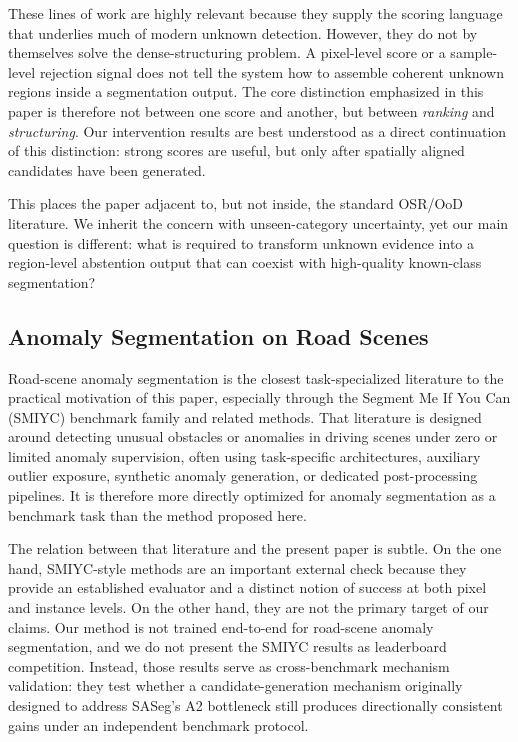 \documentclass[a4paper,fleqn]{cas-dc}
\begin{document}
These lines of work are highly relevant because they supply the scoring language that underlies much of modern unknown detection. However, they do not by themselves solve the dense-structuring problem. A pixel-level score or a sample-level rejection signal does not tell the system how to assemble coherent unknown regions inside a segmentation output. The core distinction emphasized in this paper is therefore not between one score and another, but between \emph{ranking} and \emph{structuring}. Our intervention results are best understood as a direct continuation of this distinction: strong scores are useful, but only after spatially aligned candidates have been generated.

This places the paper adjacent to, but not inside, the standard OSR/OoD literature. We inherit the concern with unseen-category uncertainty, yet our main question is different: what is required to transform unknown evidence into a region-level abstention output that can coexist with high-quality known-class segmentation?


\subsection{Anomaly Segmentation on Road Scenes}
\label{sec:related:anomaly}

Road-scene anomaly segmentation is the closest task-specialized literature to the practical motivation of this paper, especially through the Segment Me If You Can (SMIYC) benchmark family and related methods. That literature is designed around detecting unusual obstacles or anomalies in driving scenes under zero or limited anomaly supervision, often using task-specific architectures, auxiliary outlier exposure, synthetic anomaly generation, or dedicated post-processing pipelines. It is therefore more directly optimized for anomaly segmentation as a benchmark task than the method proposed here.

The relation between that literature and the present paper is subtle. On the one hand, SMIYC-style methods are an important external check because they provide an established evaluator and a distinct notion of success at both pixel and instance levels. On the other hand, they are not the primary target of our claims. Our method is not trained end-to-end for road-scene anomaly segmentation, and we do not present the SMIYC results as leaderboard competition. Instead, those results serve as cross-benchmark mechanism validation: they test whether a candidate-generation mechanism originally designed to address SASeg's A2 bottleneck still produces directionally consistent gains under an independent benchmark protocol.
\end{document}
